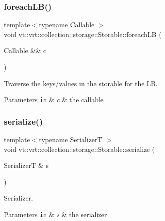 \subsubsection{\texorpdfstring{foreach\+L\+B()}{foreachLB()}}
{\footnotesize\ttfamily template$<$typename Callable $>$ \\
void vt\+::vrt\+::collection\+::storage\+::\+Storable\+::foreach\+LB (\begin{DoxyParamCaption}\item[{Callable \&\&}]{c }\end{DoxyParamCaption})\hspace{0.3cm}{\ttfamily [inline]}}



Traverse the keys/values in the storable for the LB. 


\begin{DoxyParams}[1]{Parameters}
\mbox{\tt in}  & {\em c} & the callable \\
\hline
\end{DoxyParams}
\mbox{\label{structvt_1_1vrt_1_1collection_1_1storage_1_1_storable_a9fac390a50e3de2776afb730dd3c0418}} 
\subsubsection{\texorpdfstring{serialize()}{serialize()}}
{\footnotesize\ttfamily template$<$typename SerializerT $>$ \\
void vt\+::vrt\+::collection\+::storage\+::\+Storable\+::serialize (\begin{DoxyParamCaption}\item[{SerializerT \&}]{s }\end{DoxyParamCaption})}



Serializer. 


\begin{DoxyParams}[1]{Parameters}
\mbox{\tt in}  & {\em s} & the serializer \\
\hline
\end{DoxyParams}
\mbox{\label{structvt_1_1vrt_1_1collection_1_1storage_1_1_storable_afc24cbef1191dfd0457575ddd28b12d9}} 
